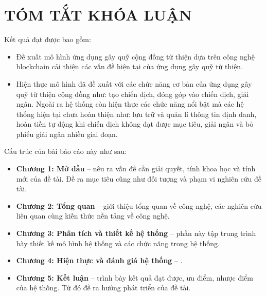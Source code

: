 \documentclass[../main-report.tex]{subfiles}
\begin{document}
\part*{TÓM TẮT KHÓA LUẬN}


Kết quả đạt được bao gồm:

\begin{itemize}
\item Đề xuất mô hình ứng dụng gây quỹ cộng đồng từ thiện dựa trên công nghệ \gls{blockchain} cải thiện các vấn đề hiện tại của ứng dụng gây quỹ từ thiện.
\item Hiện thực mô hình đã đề xuất với các chức năng cơ bản của ứng dụng gây quỹ từ thiện cộng đồng như: tạo chiến dịch, đóng góp vào chiến dịch, giải ngân. Ngoài ra hệ thống còn hiện thực các chức năng nổi bật mà các hệ thống hiện tại chưa hoàn thiện như: lưu trữ và quản lí thông tin định danh, hoàn tiền tự động khi chiến dịch không đạt được mục tiêu, giải ngân và bỏ phiếu giải ngân nhiều giai đoạn.
\end{itemize}
 
Cấu trúc của bài báo cáo này như sau:

\begin{itemize}
\item \textbf{Chương 1: Mở đầu} -- nêu ra vấn đề cần giải quyết, tính khoa học và tính mới của đề tài. Đề ra mục tiêu cũng như đối tượng và phạm vi nghiên cứu đề tài.
\item \textbf{Chương 2: Tổng quan} -- giới thiệu tổng quan về công nghệ, các nghiên cứu liên quan cùng kiến thức nền tảng về công nghệ.
\item \textbf{Chương 3: Phân tích và thiết kế hệ thống} -- phần này tập trung trình bày thiết kế mô hình hệ thống và các chức năng trong hệ thống.
\item \textbf{Chương 4: Hiện thực và đánh giá hệ thống} -- .
\item \textbf{Chương 5: Kết luận} -- trình bày kết quả đạt được, ưu điểm, nhược điểm của hệ thống. Từ đó đề ra hướng phát triển của đề tài.
\end{itemize}
\end{document}
